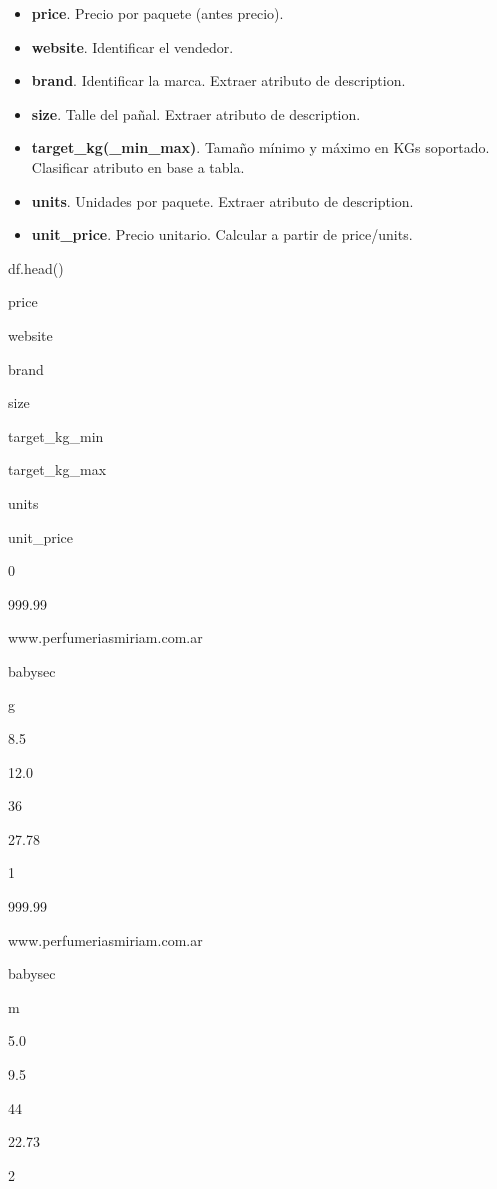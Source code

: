 \documentclass[
]{article}
\newenvironment{Shaded}{\begin{snugshade}}{\end{snugshade}}
\newcommand{\NormalTok}[1]{#1}
\providecommand{\tightlist}{%
  \setlength{\itemsep}{0pt}\setlength{\parskip}{0pt}}
\begin{document}
\begin{itemize}
\tightlist
\item
  \textbf{price}. Precio por paquete (antes precio).
\item
  \textbf{website}. Identificar el vendedor.
\item
  \textbf{brand}. Identificar la marca. Extraer atributo de description.
\item
  \textbf{size}. Talle del pañal. Extraer atributo de description.
\item
  \textbf{target\_kg(\_min\textbar\_max)}. Tamaño mínimo y máximo en KGs
  soportado. Clasificar atributo en base a tabla.
\item
  \textbf{units}. Unidades por paquete. Extraer atributo de description.
\item
  \textbf{unit\_price}. Precio unitario. Calcular a partir de
  price/units.
\end{itemize}

\begin{Shaded}
\begin{Highlighting}[]
\NormalTok{df.head()}
\end{Highlighting}
\end{Shaded}

price

website

brand

size

target\_kg\_min

target\_kg\_max

units

unit\_price

0

999.99

www.perfumeriasmiriam.com.ar

babysec

g

8.5

12.0

36

27.78

1

999.99

www.perfumeriasmiriam.com.ar

babysec

m

5.0

9.5

44

22.73

2
\end{document}
